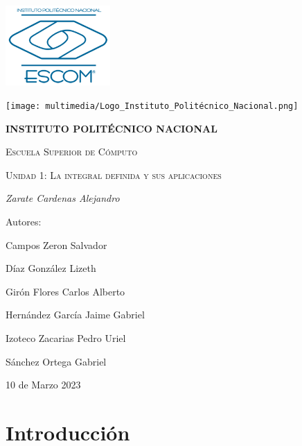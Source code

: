 \documentclass{article}
\begin{document}
  \begin{titlepage}
    {\includegraphics[width=0.3\textwidth]{multimedia/ESCOM-Logo.png}}
    \hfill
    {\texttt{[image: multimedia/Logo\_Instituto\_Politécnico\_Nacional.png]}\par}
    \vspace{1cm}
    \centering
    {\bfseries\LARGE  INSTITUTO POLIT\'ECNICO NACIONAL\par}
    \vspace{1cm}
    {\scshape\LARGE Escuela Superior de C\'omputo\par}
    \vspace{1cm}
    {\scshape\Huge Unidad 1: La integral definida y sus aplicaciones \par}
    \vspace{2cm}
    {\itshape\Large Zarate Cardenas Alejandro\par}
    \vfill
    {\Large Autores:\par}
    {\Large Campos Zeron Salvador\par}
    {\Large Díaz González Lizeth\par}
    {\Large Girón Flores Carlos Alberto\par}
    {\Large Hernández García Jaime Gabriel\par}
    {\Large Izoteco Zacarias Pedro Uriel\par}
    {\Large S\'anchez Ortega Gabriel\par}
    \vfill
    {\Large 10 de Marzo 2023 \par}
  \end{titlepage}

  \renewcommand*\contentsname{Índice}
  \tableofcontents
  \newpage
  \section{Introducción}
\end{document}
